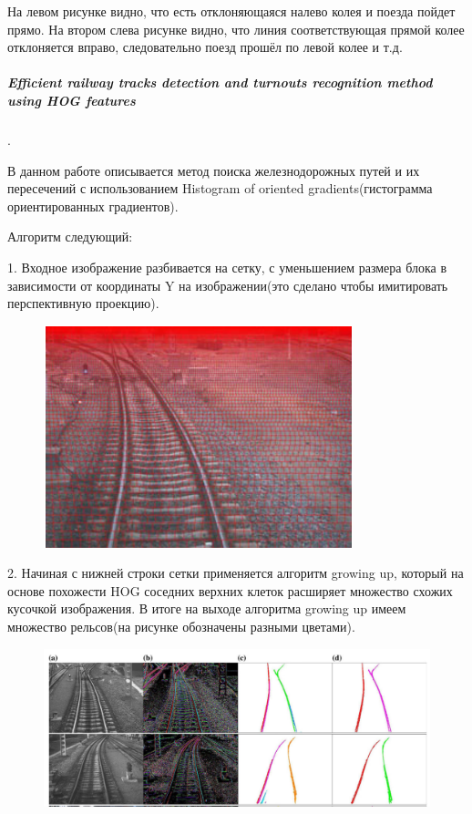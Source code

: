 На левом рисунке видно, что есть отклоняющаяся налево колея и поезда пойдет прямо.
На втором слева рисунке видно, что линия соответствующая прямой колее отклоняется вправо, следовательно поезд прошёл по левой колее и т.д.

\subparagraph{Efficient railway tracks detection and turnouts recognition method using HOG features \cite{b:growing_up}}.

В данном работе описывается метод поиска железнодорожных путей и их пересечений с
использованием Histogram of oriented gradients\cite{b:HOG}(гистограмма ориентированных градиентов).

\newpage
Алгоритм следующий:

1. Входное изображение разбивается на сетку, с уменьшением размера блока в зависимости от координаты Y на изображении(это сделано чтобы имитировать перспективную проекцию).
\begin{figure}[!h]
	\centering
	\includegraphics[width=1\linewidth]{pictures/screenshot009}
	\caption{}
	\label{fig:screenshot009}
\end{figure}

2. Начиная с нижней строки сетки применяется алгоритм growing up, который на основе похожести HOG соседних верхних клеток расширяет множество схожих кусочкой изображения.
В итоге на выходе алгоритма growing up имеем множество рельсов(на рисунке обозначены разными цветами).
\begin{figure}[!h]
	\centering
	\includegraphics[width=1\linewidth]{pictures/screenshot010}
	\caption{}
	\label{fig:screenshot010}
\end{figure}






